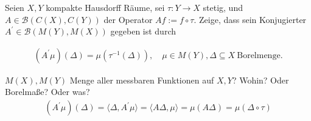 \begin{exercise}

Seien $X, Y$ kompakte Hausdorff Räume, sei $\tau: Y \to X$ stetig, und $A \in \mathcal{B}(C(X), C(Y))$ der Operator $A f := f \circ \tau$.
Zeige, dass sein Konjugierter $A^\prime \in \mathcal{B}(M(Y), M(X))$ gegeben ist durch

\begin{align*}
  (A^\prime \mu)(\Delta) = \mu(\tau^{-1}(\Delta)),
  \quad
  \mu \in M(Y), \Delta \subseteq X ~\text{Borelmenge}.
\end{align*}

\end{exercise}

\begin{solution}
$M(X),M(Y)$ Menge aller messbaren Funktionen auf $X,Y$? Wohin?
Oder Borelmaße? Oder was?
\begin{align*}
  (A^{\prime}\mu)(\Delta) = \langle \Delta, A^{\prime}\mu \rangle =
  \langle A \Delta, \mu \rangle = \mu(A \Delta) = \mu(\Delta \circ \tau)
\end{align*}


\end{solution}

